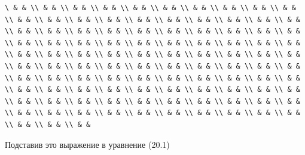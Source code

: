 \documentclass[
  ukrainian,
]{article}
\begin{document}
\begin{verbatim}
\ & & \\ & & \\ & & \\ & & \\ & & \\ & & \\ & & \\ & & \\ & & \\ & & \\ & & \\ & & \\ & & \\ & & \\ & & \\ & & \\ & & \\ & & \\ & & \\ & & \\ & & \\ & & \\ & & \\ & & \\ & & \\ & & \\ & & \\ & & \\ & & \\ & & \\ & & \\ & & \\ & & \\ & & \\ & & \\ & & \\ & & \\ & & \\ & & \\ & & \\ & & \\ & & \\ & & \\ & & \\ & & \\ & & \\ & & \\ & & \\ & & \\ & & \\ & & \\ & & \\ & & \\ & & \\ & & \\ & & \\ & & \\ & & \\ & & \\ & & \\ & & \\ & & \\ & & \\ & & \\ & & \\ & & \\ & & \\ & & \\ & & \\ & & \\ & & \\ & & \\ & & \\ & & \\ & & \\ & & \\ & & \\ & & \\ & & \\ & & \\ & & \\ & & \\ & & \\ & & \\ & & \\ & & \\ & & \\ & & \\ & & \\ & & \\ & & \\ & & \\ & & \\ & & \\ & & \\ & & \\ & & \\ & & \\ & & \\ & & \\ & & \\ & & \\ & &
\end{verbatim}

Подставив это выражение в уравнение (20.1) 
\end{document}
